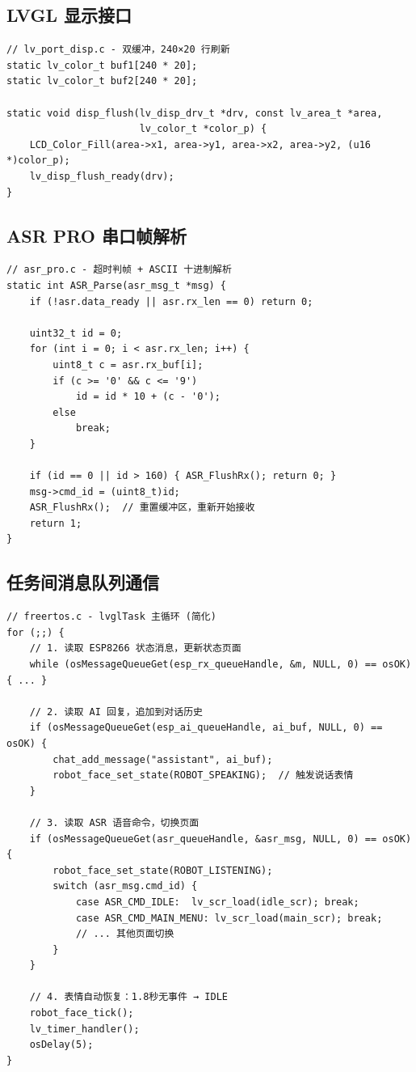 \documentclass[12pt,a4paper]{ctexart}
\begin{document}
\subsection{LVGL 显示接口}

\begin{lstlisting}
// lv_port_disp.c - 双缓冲，240×20 行刷新
static lv_color_t buf1[240 * 20];
static lv_color_t buf2[240 * 20];

static void disp_flush(lv_disp_drv_t *drv, const lv_area_t *area,
                       lv_color_t *color_p) {
    LCD_Color_Fill(area->x1, area->y1, area->x2, area->y2, (u16 *)color_p);
    lv_disp_flush_ready(drv);
}
\end{lstlisting}

\subsection{ASR PRO 串口帧解析}

\begin{lstlisting}
// asr_pro.c - 超时判帧 + ASCII 十进制解析
static int ASR_Parse(asr_msg_t *msg) {
    if (!asr.data_ready || asr.rx_len == 0) return 0;

    uint32_t id = 0;
    for (int i = 0; i < asr.rx_len; i++) {
        uint8_t c = asr.rx_buf[i];
        if (c >= '0' && c <= '9')
            id = id * 10 + (c - '0');
        else
            break;
    }

    if (id == 0 || id > 160) { ASR_FlushRx(); return 0; }
    msg->cmd_id = (uint8_t)id;
    ASR_FlushRx();  // 重置缓冲区，重新开始接收
    return 1;
}
\end{lstlisting}

\subsection{任务间消息队列通信}

\begin{lstlisting}
// freertos.c - lvglTask 主循环 (简化)
for (;;) {
    // 1. 读取 ESP8266 状态消息，更新状态页面
    while (osMessageQueueGet(esp_rx_queueHandle, &m, NULL, 0) == osOK) { ... }

    // 2. 读取 AI 回复，追加到对话历史
    if (osMessageQueueGet(esp_ai_queueHandle, ai_buf, NULL, 0) == osOK) {
        chat_add_message("assistant", ai_buf);
        robot_face_set_state(ROBOT_SPEAKING);  // 触发说话表情
    }

    // 3. 读取 ASR 语音命令，切换页面
    if (osMessageQueueGet(asr_queueHandle, &asr_msg, NULL, 0) == osOK) {
        robot_face_set_state(ROBOT_LISTENING);
        switch (asr_msg.cmd_id) {
            case ASR_CMD_IDLE:  lv_scr_load(idle_scr); break;
            case ASR_CMD_MAIN_MENU: lv_scr_load(main_scr); break;
            // ... 其他页面切换
        }
    }

    // 4. 表情自动恢复：1.8秒无事件 → IDLE
    robot_face_tick();
    lv_timer_handler();
    osDelay(5);
}
\end{lstlisting}
\end{document}
